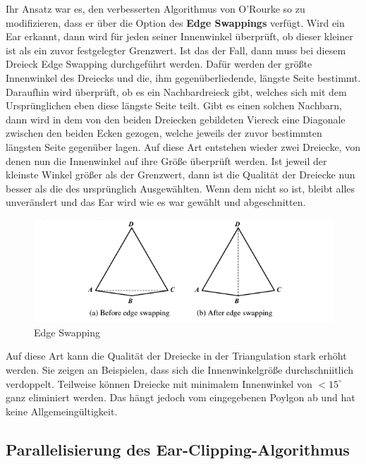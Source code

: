 Ihr Ansatz war es, den verbesserten Algorithmus von O'Rourke so zu modifizieren, dass er über die Option des \textbf{Edge Swappings} verfügt.
Wird ein Ear erkannt, dann wird für jeden seiner Innenwinkel überprüft, ob dieser kleiner ist als ein zuvor festgelegter Grenzwert. Ist das der Fall, dann 
muss bei diesem Dreieck Edge Swapping durchgeführt werden. Dafür werden der größte Innenwinkel des Dreiecks und die, ihm gegenüberliedende, längste Seite bestimmt.
Daraufhin wird überprüft, ob es ein Nachbardreieck gibt, welches sich mit dem Ursprünglichen eben diese längste Seite teilt. Gibt es einen solchen Nachbarn, 
dann wird in dem von den beiden Dreiecken gebildeten Viereck eine Diagonale zwischen den beiden Ecken gezogen, welche jeweils der zuvor bestimmten längsten Seite gegenüber lagen.
Auf diese Art entstehen wieder zwei Dreiecke, von denen nun die Innenwinkel auf ihre Größe überprüft werden. Ist jeweil der kleinste Winkel größer als der Grenzwert, 
dann ist die Qualität der Dreiecke nun besser als die des ursprünglich Ausgewählten. Wenn dem nicht so ist, bleibt alles unverändert und das Ear wird wie es war gewählt und abgeschnitten.

\begin{figure}[h]
    \includegraphics[width=1\textwidth]{bilder/edgeswapping.png}
    \caption[Edge Swapping]{Edge Swapping \cite{earclipping}}
    \label{fig:edgeswapping}
\end{figure}

Auf diese Art kann die Qualität der Dreiecke in der Triangulation stark erhöht werden. Sie zeigen an Beispielen, dass sich die Innenwinkelgröße durchschniitlich verdoppelt.
Teilweise können Dreiecke mit minimalem Innenwinkel von $< 15^\circ$ ganz eliminiert werden. Das hängt jedoch vom eingegebenen Poylgon ab und hat keine Allgemeingültigkeit.

\subsection{Parallelisierung des Ear-Clipping-Algorithmus}

